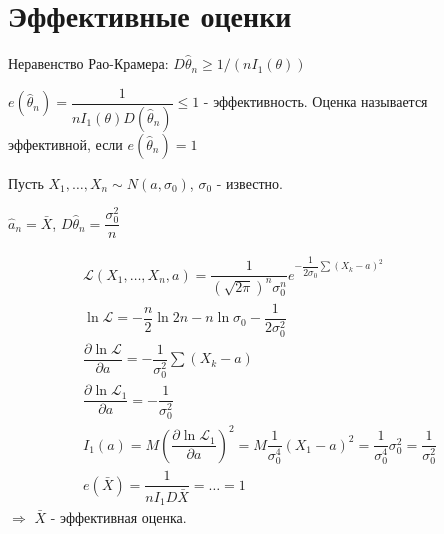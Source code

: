 \section{Эффективные оценки}

Неравенство Рао-Крамера: $D\hat \theta_n \geqslant 1 / (n I_1(\theta))$

\begin{def}
  $e(\hat \theta_n) = \dfrac{1}{n I_1(\theta) D(\hat\theta_n)} \leqslant 1$ - эффективность.
  Оценка называется эффективной, если $e(\hat\theta_n) = 1$
\end{def}

\begin{ex}
  Пусть $X_1, \dots, X_n \sim N(a, \sigma_0)$, $\sigma_0$ - известно.
  
  $\hat a_n = \bar X$, $D\hat\theta_n = \dfrac{\sigma_0^2}{n}$

  \begin{multline*}
    \mathcal{L} (X_1, \dots, X_n, a)
    = \dfrac{1}{(\sqrt{2\pi})^n \sigma_0^n} e^{-\dfrac{1}{2\sigma_0} \sum (X_k-a)^2 } \\
    \ln \mathcal{L} = -\dfrac{n}{2} \ln 2n - n \ln \sigma_0 - \dfrac{1}{2\sigma_0^2} \\
    \dfrac{\partial \ln \mathcal{L}}{\partial a} = - \dfrac{1}{\sigma_0^2}\sum (X_k-a) \\
    \dfrac{\partial \ln \mathcal{L}_1}{\partial a} = - \dfrac{1}{\sigma_0^2} \\
    I_1(a) = M( \dfrac{\partial \ln \mathcal{L}_1}{\partial a}  )^2
    = M \dfrac{1}{\sigma_0^4} (X_1-a)^2
    = \dfrac{1}{\sigma_0^4} \sigma_0^2 = \dfrac{1}{\sigma_0^2} \\
    e(\bar X) = \dfrac{1}{n I_1 D\bar X} = \dots = 1
  \end{multline*}
  $\Rightarrow$ $\bar X$ - эффективная оценка.
\end{ex}

